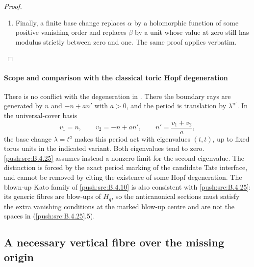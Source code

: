 \begin{proof}
\begin{enumerate}[label=\arabic*.,leftmargin=*]
\item Finally, a finite base change replaces $\alpha$ by
a holomorphic function of some positive vanishing
order and replaces $\beta$ by a unit whose value
at zero still has modulus strictly between zero and
one. The same proof applies verbatim.
\end{enumerate}
\end{proof}


\paragraph{Scope and comparison with the classical toric Hopf degeneration}
There is no conflict with the degeneration in
\citet[Section 13, pp.~116--118]{Oda1978D}.
There the boundary rays are generated by $n$ and
$-n+a n'$ with $a>0$, and the period is translation
by $\lambda^{n'}$. In the universal-cover basis
\[
 v_1=n,\qquad v_2=-n+a n',\qquad
 n'=\frac{v_1+v_2}{a},
\]
the base change $\lambda=t^a$ makes this period
act with eigenvalues $(t,t)$, up to fixed torus
units in the indicated variant. Both eigenvalues
tend to zero. \ref{push:src:B.4.25} assumes instead a nonzero
limit for the second eigenvalue. The distinction
is forced by the exact period marking of the
candidate Tate interface, and cannot be removed
by citing the existence of some Hopf degeneration.
The blown-up Kato family of \ref{push:src:B.4.10} is also consistent
with \ref{push:src:B.4.25}: its generic fibres are blow-ups of
$H_q$, so the anticanonical sections must satisfy
the extra vanishing conditions at the marked
blow-up centre and are not the spaces in
(\ref{push:src:B.4.25}.5).




\subsection{A necessary vertical fibre over the missing origin}


